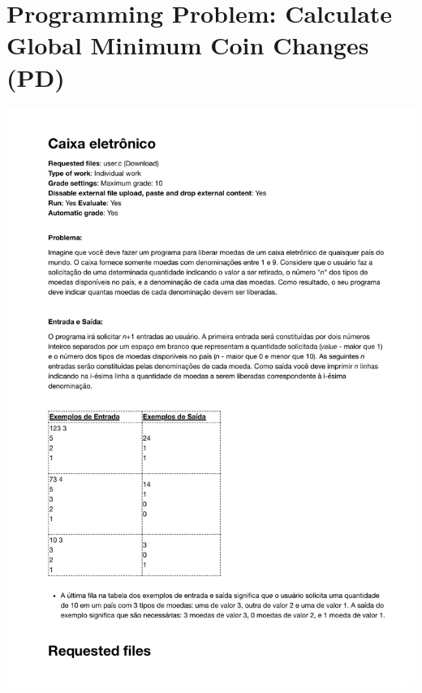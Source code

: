 \section{Programming Problem: Calculate Global Minimum Coin Changes (PD)}
\label{annex:second-study-pD}
\includegraphics[page=1,width=1\textwidth]{images/annex/second-study-pD.pdf}

\newpage
